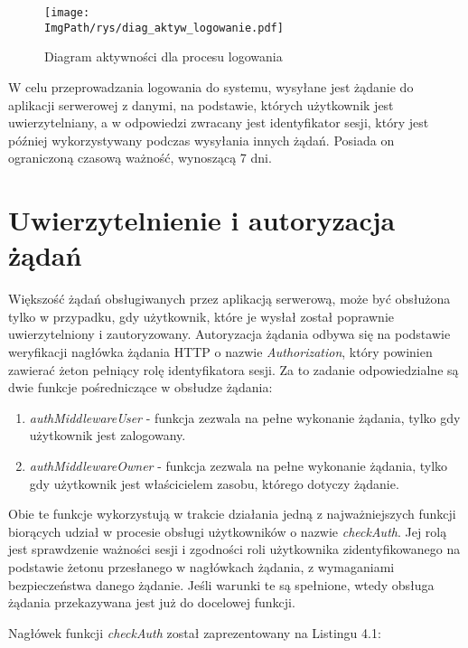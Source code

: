 \documentclass[a4paper,12pt,twoside,openany]{report}
\newcommand{\ImgPath}{.}
\begin{document}
\begin{figure}[!htbp]
	\begin{center}
		\centering
		\texttt{[image: \\ImgPath/rys/diag\_aktyw\_logowanie.pdf]}
	\end{center}
	\caption{Diagram aktywności dla procesu logowania}
	\label{diagramAktywnosciLogowanie}
\end{figure}
\newpage
W celu przeprowadzania logowania do systemu, wysyłane jest żądanie do aplikacji serwerowej z danymi, na podstawie, których użytkownik jest uwierzytelniany, a w odpowiedzi zwracany jest identyfikator sesji, który jest później wykorzystywany podczas wysyłania innych żądań. Posiada on ograniczoną czasową ważność, wynoszącą 7 dni.



\section{Uwierzytelnienie i autoryzacja żądań}
Większość żądań obsługiwanych przez aplikacją serwerową, może być obsłużona tylko w przypadku, gdy użytkownik, które je wysłał został poprawnie uwierzytelniony i zautoryzowany. 
Autoryzacja żądania odbywa się na podstawie weryfikacji nagłówka żądania HTTP o nazwie \textit{Authorization}, który powinien zawierać żeton pełniący rolę identyfikatora sesji. Za to zadanie odpowiedzialne są dwie funkcje pośredniczące w obsłudze żądania: 
\begin{enumerate}
	
	\item \textit{authMiddlewareUser} - funkcja zezwala na pełne wykonanie żądania, tylko gdy użytkownik jest zalogowany.
	
	\item \textit{authMiddlewareOwner} - funkcja zezwala na pełne wykonanie żądania, tylko gdy użytkownik jest właścicielem zasobu, którego dotyczy żądanie.
	
\end{enumerate}

Obie te funkcje wykorzystują w trakcie działania jedną z najważniejszych funkcji biorących udział w procesie obsługi użytkowników o nazwie \textit{checkAuth}. Jej rolą jest sprawdzenie ważności sesji i zgodności roli użytkownika zidentyfikowanego na podstawie żetonu przesłanego w nagłówkach żądania, z wymaganiami bezpieczeństwa danego żądanie. Jeśli warunki te są spełnione, wtedy obsługa żądania przekazywana jest już do docelowej funkcji. 

Nagłówek funkcji \textit{checkAuth} został zaprezentowany na Listingu 4.1:
\end{document}
